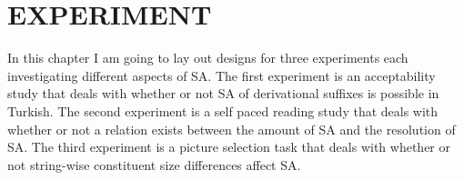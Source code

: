 \chapter{\MakeUppercase{Experiment}}
\setcounter{exx}{0}

In this chapter I am going to lay out designs for three experiments each investigating different aspects of SA. The first experiment is an acceptability study that deals with whether or not SA of derivational suffixes is possible in Turkish. The second experiment is a self paced reading study that deals with whether or not a relation exists between the amount of SA and the resolution of SA. The third experiment is a picture selection task that deals with whether or not string-wise constituent size differences affect SA.






